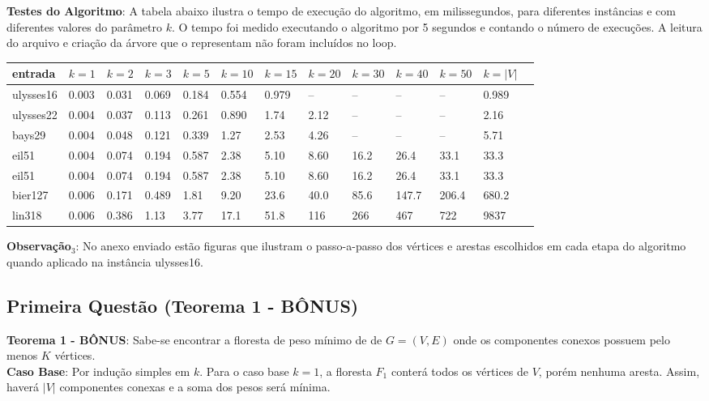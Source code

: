 \documentclass{article}
\begin{document}
\textbf{Testes do Algoritmo}: A tabela abaixo ilustra o tempo de execução do algoritmo, em milissegundos, para diferentes instâncias e com diferentes valores do parâmetro $k$. O tempo foi medido executando o algoritmo por 5 segundos e contando o número de execuções. A leitura do arquivo e criação da árvore que o representam não foram incluídos no loop.

\begin{table}[H]
\centering
\begin{tabular}{l|l|l|l|l|l|l|l|l|l|l|l|l}
entrada & $k=1$ & $k=2$ & $k=3$ & $k=5$ & $k=10$ & $k=15$ & $k=20$ & $k=30$ & $k=40$ & $k=50$ & $k=|V|$ \\\hline
ulysses16 & 0.003 & 0.031 & 0.069 & 0.184 & 0.554 & 0.979 & -- & -- & -- & -- & 0.989 \\
ulysses22 & 0.004 & 0.037 & 0.113 & 0.261 & 0.890 & 1.74 & 2.12 & -- & -- & -- & 2.16 \\
bays29 & 0.004 & 0.048 & 0.121 & 0.339 & 1.27 & 2.53 & 4.26 & -- & -- & -- & 5.71 \\
eil51 & 0.004 & 0.074 & 0.194 & 0.587 & 2.38 & 5.10 & 8.60 & 16.2 & 26.4 & 33.1 & 33.3 \\
eil51 & 0.004 & 0.074 & 0.194 & 0.587 & 2.38 & 5.10 & 8.60 & 16.2 & 26.4 & 33.1 & 33.3 \\
bier127 & 0.006 & 0.171 & 0.489 & 1.81 & 9.20 & 23.6 & 40.0 & 85.6 & 147.7 & 206.4 & 680.2 \\
lin318 & 0.006 & 0.386 & 1.13 & 3.77 & 17.1 & 51.8 & 116 & 266 & 467 & 722 & 9837 \\
\end{tabular}
\end{table}

\textbf{Observação$_3$}: No anexo enviado estão figuras que ilustram o passo-a-passo dos vértices e arestas escolhidos em cada etapa do algoritmo quando aplicado na instância ulysses16.

\subsection{Primeira Questão (Teorema 1 - BÔNUS)}

\textbf{Teorema 1 - BÔNUS}: Sabe-se encontrar a floresta de peso mínimo de de $G=(V,E)$ onde os componentes conexos possuem pelo menos $K$ vértices.\\

\textbf{Caso Base}: Por indução simples em $k$. Para o caso base $k = 1$, a floresta $F_1$ conterá todos os vértices de $V$, porém nenhuma aresta. Assim, haverá $|V|$ componentes conexas e a soma dos pesos será mínima.\\
\end{document}
